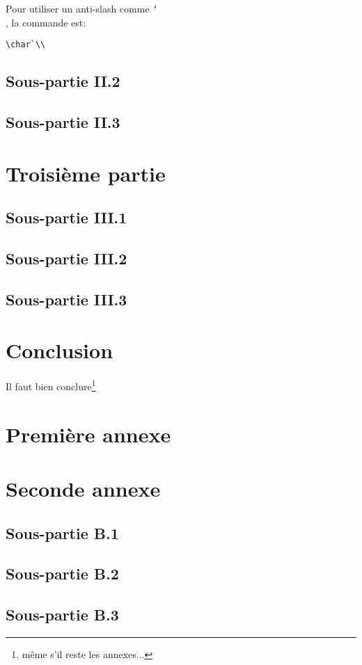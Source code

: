 \documentclass[a4paper,10pt]{article}
\newcommand{\bksl}{\char`\\} %
\begin{document}
Pour utiliser un anti-slash comme \texttt{\bksl}, la commande est:
\begin{verbatim}
\char`\\
\end{verbatim}

\subsection{Sous-partie II.2}
\subsection{Sous-partie II.3}

\clearpage
\section{Troisième partie}
\subsection{Sous-partie III.1}
\subsection{Sous-partie III.2}
\subsection{Sous-partie III.3}

\clearpage
\section*{Conclusion}

Il faut bien conclure\footnote{même s'il reste les annexes...}

\clearpage
\begin{appendices}
\section{Première annexe}
\label{appendiceA}

\section{Seconde annexe}
\label{appendiceB}

\subsection{Sous-partie B.1}
\subsection{Sous-partie B.2}
\subsection{Sous-partie B.3}

\end{appendices}
\end{document}
